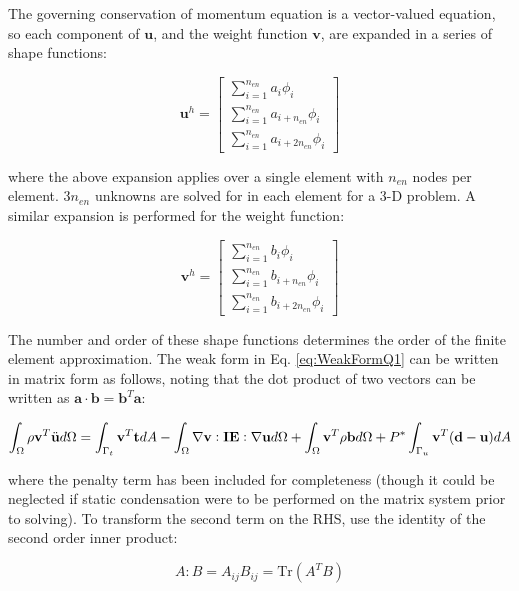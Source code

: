 \documentclass[10pt]{article}
\begin{document}
The governing conservation of momentum equation is a vector-valued equation, so each component of \(\textbf{u}\), and the weight function \(\textbf{v}\), are expanded in a series of shape functions:

\begin{equation}
\label{eq:UExpansion}
\textbf{u}^h=\begin{bmatrix}\sum_{i=1}^{n_{en}}a_i\phi_i\\\sum_{i=1}^{n_{en}}a_{i+n_{en}}\phi_i\\\sum_{i=1}^{n_{en}}a_{i+2n_{en}}\phi_i\end{bmatrix}
\end{equation}

where the above expansion applies over a single element with \(n_{en}\) nodes per element. \(3n_{en}\) unknowns are solved for in each element for a 3-D problem. A similar expansion is performed for the weight function:

\begin{equation}
\textbf{v}^h=\begin{bmatrix}\sum_{i=1}^{n_{en}}b_i\phi_i\\\sum_{i=1}^{n_{en}}b_{i+n_{en}}\phi_i\\\sum_{i=1}^{n_{en}}b_{i+2n_{en}}\phi_i\end{bmatrix}
\end{equation}

The number and order of these shape functions determines the order of the finite element approximation. The weak form in Eq. \eqref{eq:WeakFormQ1} can be written in matrix form as follows, noting that the dot product of two vectors can be written as \(\textbf{a}\cdot\textbf{b}=\textbf{b}^T\textbf{a}\):

\begin{equation}
\label{eq:FEStep1}
\int_{\Omega}\rho\textbf{v}^T\ddot{\textbf{u}}d\Omega=\int_{\Gamma_t}\textbf{v}^T\textbf{t}dA- \int_{\Omega}\nabla\textbf{v}:\textbf{IE}:\nabla\textbf{u}d\Omega +\int_{\Omega}\textbf{v}^T\rho\textbf{b}d\Omega+P^{*}\int_{\Gamma_u}\textbf{v}^T(\textbf{d}-\textbf{u})dA\\
\end{equation}

where the penalty term has been included for completeness (though it could be neglected if static condensation were to be performed on the matrix system prior to solving). To transform the second term on the RHS, use the identity of the second order inner product:

\begin{equation}
A:B=A_{ij}B_{ij}=\text{Tr}(A^TB)
\end{equation}
\end{document}
